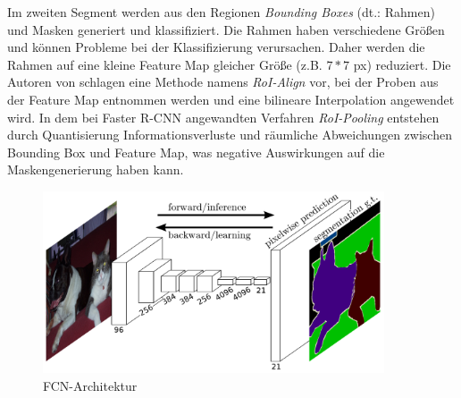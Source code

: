 \noindent
Im zweiten Segment werden aus den Regionen \textit{Bounding Boxes} (dt.: Rahmen) und Masken generiert und klassifiziert. Die Rahmen haben verschiedene Größen und können Probleme bei der Klassifizierung verursachen. Daher werden die Rahmen auf eine kleine Feature Map gleicher Größe (z.B. $7*7$ px) reduziert. Die Autoren von \cite{ref:maskrcnn} schlagen eine Methode namens \textit{RoI-Align} vor, bei der Proben aus der Feature Map entnommen werden und eine bilineare Interpolation angewendet wird. In dem bei Faster R-CNN angewandten Verfahren \textit{RoI-Pooling} entstehen durch Quantisierung Informationsverluste und räumliche Abweichungen zwischen Bounding Box und Feature Map, was negative Auswirkungen auf die Maskengenerierung haben kann.\cite[S. 3f.]{ref:maskrcnn}
\\
\begin{figure}[ht]
  \centering
  \includegraphics[width=0.90\textwidth]{pics/fcn-architecture.PNG}
  \caption[FCN-Architektur]{FCN-Architektur\cite{ref:mask-rcnn-architecture}}
  \label{fig:fcn-architecture}
\end{figure}

